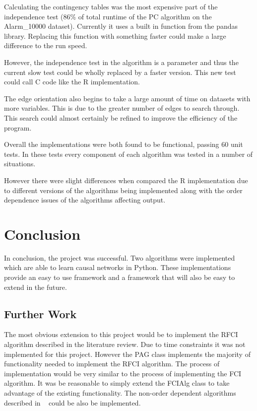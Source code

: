 \documentclass{UoYCSproject}
\begin{document}
Calculating the contingency tables was the most expensive part of the independence test (86\% of total runtime of the PC algorithm on the Alarm\_10000 dataset). Currently it uses a built in function from the pandas library. Replacing this function with something faster could make a large difference to the run speed.

However, the independence test in the algorithm is a parameter and thus the current slow test could be wholly replaced by a faster version. This new test could call C code like the R implementation.

The edge orientation also begins to take a large amount of time on datasets with more variables. This is due to the greater number of edges to search through. This search could almost certainly be refined to improve the efficiency of the program.

Overall the implementations were both found to be functional, passing 60 unit tests. In these tests every component of each algorithm was tested in a number of situations.

However there were slight differences when compared the R implementation due to different versions of the algorithms being implemented along with the order dependence issues of the algorithms affecting output.

\chapter{Conclusion}
In conclusion, the project was successful. Two algorithms were implemented which are able to learn causal networks in Python. These implementations provide an easy to use framework and a framework that will also be easy to extend in the future.

\section{Further Work}
The most obvious extension to this project would be to implement the RFCI algorithm described in the literature review. Due to time constraints it was not implemented for this project. However the PAG class implements the majority of functionality needed to implement the RFCI algorithm. The process of implementation would be very similar to the process of implementing the FCI algorithm. It was be reasonable to simply extend the FCIAlg class to take advantage of the existing functionality. The non-order dependent algorithms described in ~\parencite{colombo2014order} could be also be implemented.
\end{document}
